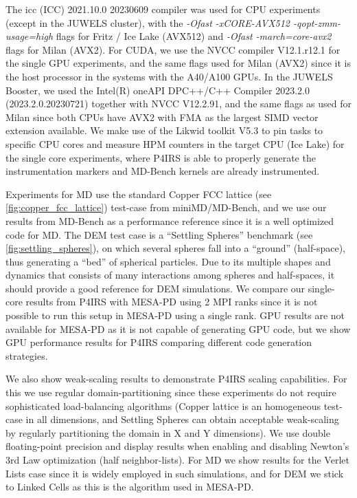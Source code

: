 \documentclass[preprint,12pt]{elsarticle}
\begin{document}
The icc (ICC) 2021.10.0 20230609 compiler was used for CPU experiments (except in the JUWELS cluster), with the \emph{-Ofast -xCORE-AVX512 -qopt-zmm-usage=high} flags for Fritz / Ice Lake (AVX512) and \emph{-Ofast -march=core-avx2} flags for Milan (AVX2).
For CUDA, we use the NVCC compiler V12.1.r12.1 for the single GPU experiments, and the same flags used for Milan (AVX2) since it is the host processor in the systems with the A40/A100 GPUs.
In the JUWELS Booster, we used the Intel(R) oneAPI DPC++/C++ Compiler 2023.2.0 (2023.2.0.20230721) together with NVCC V12.2.91, and the same flags as used for Milan since both CPUs have AVX2 with FMA as the largest SIMD vector extension available.
We make use of the Likwid toolkit V5.3 \cite{likwid} to pin tasks to specific CPU cores and measure HPM counters in the target CPU (Ice Lake) for the single core experiments, where P4IRS is able to properly generate the instrumentation markers and MD-Bench kernels are already instrumented.

Experiments for \ac{MD} use the standard Copper FCC lattice (see \autoref{fig:copper_fcc_lattice}) test-case from miniMD/MD-Bench, and we use our results from MD-Bench as a performance reference since it is a well optimized code for \ac{MD}.
The \ac{DEM} test case is a ``Settling Spheres'' benchmark (see \autoref{fig:settling_spheres}), on which several spheres fall into a ``ground'' (half-space), thus generating a ``bed'' of spherical particles.
Due to its multiple shapes and dynamics that consists of many interactions among spheres and half-spaces, it should provide a good reference for DEM simulations.
We compare our single-core results from P4IRS with MESA-PD using 2 MPI ranks since it is not possible to run this setup in MESA-PD using a single rank.
GPU results are not available for MESA-PD as it is not capable of generating GPU code, but we show GPU performance results for P4IRS comparing different code generation strategies.

We also show weak-scaling results to demonstrate P4IRS scaling capabilities.
For this we use regular domain-partitioning since these experiments do not require sophisticated load-balancing algorithms (Copper lattice is an homogeneous test-case in all dimensions, and Settling Spheres can obtain acceptable weak-scaling by regularly partitioning the domain in X and Y dimensions).
We use double floating-point precision and display results when enabling and disabling Newton's 3rd Law optimization (half neighbor-lists).
For \ac{MD} we show results for the Verlet Lists case since it is widely employed in such simulations, and for \ac{DEM} we stick to Linked Cells as this is the algorithm used in MESA-PD.
\end{document}

